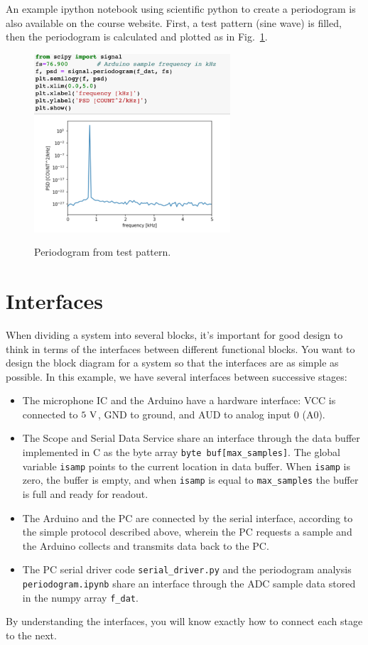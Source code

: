 \documentclass[12pt]{article}
\begin{document}
An example ipython notebook using scientific python to create a periodogram is also available on the course website.  First, a test pattern (sine wave) is filled, then the periodogram is calculated and plotted as in Fig.~\ref{fig:periodogram}.


\begin{figure}[htbp]
\begin{center}
{\includegraphics[width=0.65\textwidth]{figs/periodogram.png}}
\end{center}
\caption{\label{fig:periodogram} Periodogram from test pattern.}
\end{figure}

\section{Interfaces}

When dividing a system into several blocks, it's important for good design to think in terms of the interfaces between different functional blocks.  You want to design the block diagram for a system so that the interfaces are as simple as possible.  In this example, we have several interfaces between successive stages:
\begin{itemize}
\item The microphone IC and the Arduino have a hardware interface: VCC is connected to $5~\rm V$, GND to ground, and AUD to analog input 0 (A0).
\item The Scope and Serial Data Service share an interface through the data buffer implemented in C as the byte array {\tt byte buf[max\_samples]}.  The global variable {\tt isamp} points to the current location in data buffer.  When {\tt isamp} is zero, the buffer is empty, and when {\tt isamp} is equal to {\tt max\_samples}  the buffer is full and ready for readout.
\item The Arduino and the PC are connected by the serial interface, according to the simple protocol described above, wherein the PC requests a sample and the Arduino collects and transmits data back to the PC.
\item The PC serial driver code {\tt serial\_driver.py} and the periodogram analysis {\tt periodogram.ipynb} share an interface through the ADC sample data stored in the numpy array {\tt f\_dat}. 
\end{itemize}
By understanding the interfaces, you will know exactly how to connect each stage to the next.
\end{document}
